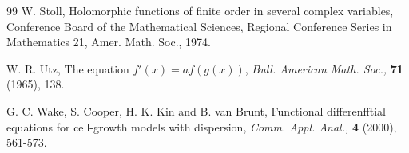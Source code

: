 \documentclass[11pt,reqno]{amsart}
\numberwithin{equation}{section}
\begin{document}
\begin{thebibliography}{99}
 {\sc W. Stoll}, Holomorphic functions of finite order in several complex variables, Conference Board of the Mathematical Sciences, Regional Conference Series in Mathematics 21, Amer. Math. Soc., 1974.

 {\sc W. R. Utz}, The equation $f'(x)= af(g(x))$, \textit{Bull. American Math. Soc.,} \textbf{71} (1965), 138.

 {\sc G. C. Wake}, {\sc S. Cooper}, {\sc H. K. Kin} and {\sc B. van Brunt}, Functional differenfftial equations for cell-growth models with dispersion, \textit{Comm. Appl. Anal.,} \textbf{4} (2000), 561-573.	
	
	
\end{thebibliography}
\end{document}
